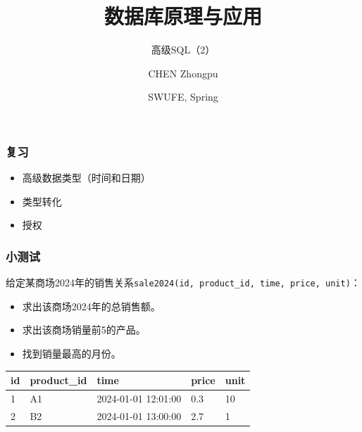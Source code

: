\documentclass[aspectratio=169, 14pt]{beamer}
\title[Database Principles and Applications] %
{数据库原理与应用}
\subtitle{高级SQL（2）}
\author[CHEN Zhongpu] %
{CHEN Zhongpu}
\institute[] %
{
  School of Computing and Artificial Intelligence \\
  \href{mailto:zpchen@swufe.edu.cn}{zpchen@swufe.edu.cn}
}
\date[] %
{SWUFE, Spring \the\year{}}
\begin{document}
\frame{\titlepage}


\begin{frame}
	\frametitle{复习}
	\begin{itemize}
		\item 高级数据类型（时间和日期）
		\item 类型转化
		\item 授权
	\end{itemize}

\end{frame}
\begin{frame}
	\frametitle{小测试}
	给定某商场2024年的销售关系\texttt{sale2024(id, product\_id, time, price, unit)}：
	\begin{itemize}
		\item 求出该商场2024年的总销售额。
		\item 求出该商场销量前5的产品。
		\item 找到销量最高的月份。
	\end{itemize}
	\begin{table}
		\begin{tabular}{lllll}
			\toprule
			id & product\_id & time                & price & unit \\
			\midrule
			1  & A1          & 2024-01-01 12:01:00 & 0.3   & 10   \\
			2  & B2          & 2024-01-01 13:00:00 & 2.7   & 1    \\
			\bottomrule
		\end{tabular}
	\end{table}
\end{frame}
\end{document}

